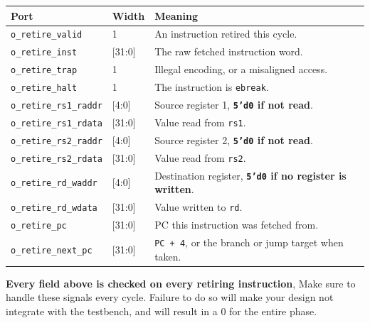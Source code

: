 \documentclass[11pt]{article}
\begin{document}
\begin{center}
\begin{tabular}{@{}llp{9.0cm}@{}}
\toprule
\textbf{Port} & \textbf{Width} & \textbf{Meaning} \\
\midrule
\texttt{o\_retire\_valid}      & 1     & An instruction retired this cycle. \\
\texttt{o\_retire\_inst}       & [31:0]& The raw fetched instruction word. \\
\texttt{o\_retire\_trap}       & 1     & Illegal encoding, or a misaligned access. \\
\texttt{o\_retire\_halt}       & 1     & The instruction is \texttt{ebreak}. \\
\texttt{o\_retire\_rs1\_raddr} & [4:0] & Source register 1, \textbf{\texttt{5'd0} if not read}. \\
\texttt{o\_retire\_rs1\_rdata} & [31:0]& Value read from \texttt{rs1}. \\
\texttt{o\_retire\_rs2\_raddr} & [4:0] & Source register 2, \textbf{\texttt{5'd0} if not read}. \\
\texttt{o\_retire\_rs2\_rdata} & [31:0]& Value read from \texttt{rs2}. \\
\texttt{o\_retire\_rd\_waddr}  & [4:0] & Destination register, \textbf{\texttt{5'd0} if no register is written}. \\
\texttt{o\_retire\_rd\_wdata}  & [31:0]& Value written to \texttt{rd}. \\
\texttt{o\_retire\_pc}         & [31:0]& PC this instruction was fetched from. \\
\texttt{o\_retire\_next\_pc}   & [31:0]& \texttt{PC + 4}, or the branch or jump target when taken. \\
\bottomrule
\end{tabular}
\end{center}

\begin{important}
\textbf{Every field above is checked on every retiring instruction},
Make sure to handle these signals every cycle. Failure to do so will make your design not integrate with the testbench, and will result in a 0 for the entire phase.
\end{important}
\end{document}
